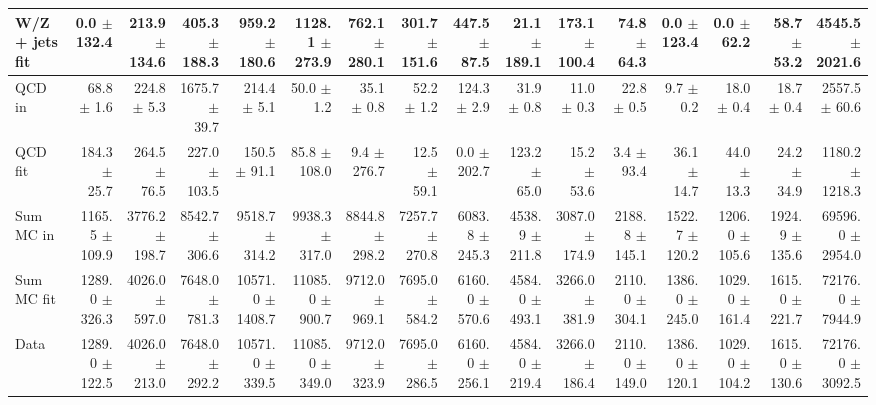\begin{table}[htbp]
{\begin{tabular}{lrrrrrrrrrrrrrrr}
W/Z + jets fit & 0.0 $\pm$ 132.4 & 213.9 $\pm$ 134.6 & 405.3 $\pm$ 188.3 & 959.2 $\pm$ 180.6 & 1128.1 $\pm$ 273.9 & 762.1 $\pm$ 280.1 & 301.7 $\pm$ 151.6 & 447.5 $\pm$ 87.5 & 21.1 $\pm$ 189.1 & 173.1 $\pm$ 100.4 & 74.8 $\pm$ 64.3 & 0.0 $\pm$ 123.4 & 0.0 $\pm$ 62.2 & 58.7 $\pm$ 53.2 & 4545.5 $\pm$ 2021.6 \\
\hline
QCD in & 68.8 $\pm$ 1.6 & 224.8 $\pm$ 5.3 & 1675.7 $\pm$ 39.7 & 214.4 $\pm$ 5.1 & 50.0 $\pm$ 1.2 & 35.1 $\pm$ 0.8 & 52.2 $\pm$ 1.2 & 124.3 $\pm$ 2.9 & 31.9 $\pm$ 0.8 & 11.0 $\pm$ 0.3 & 22.8 $\pm$ 0.5 & 9.7 $\pm$ 0.2 & 18.0 $\pm$ 0.4 & 18.7 $\pm$ 0.4 & 2557.5 $\pm$ 60.6 \\
QCD fit & 184.3 $\pm$ 25.7 & 264.5 $\pm$ 76.5 & 227.0 $\pm$ 103.5 & 150.5 $\pm$ 91.1 & 85.8 $\pm$ 108.0 & 9.4 $\pm$ 276.7 & 12.5 $\pm$ 59.1 & 0.0 $\pm$ 202.7 & 123.2 $\pm$ 65.0 & 15.2 $\pm$ 53.6 & 3.4 $\pm$ 93.4 & 36.1 $\pm$ 14.7 & 44.0 $\pm$ 13.3 & 24.2 $\pm$ 34.9 & 1180.2 $\pm$ 1218.3 \\
\hline
Sum MC in & 1165.5 $\pm$ 109.9 & 3776.2 $\pm$ 198.7 & 8542.7 $\pm$ 306.6 & 9518.7 $\pm$ 314.2 & 9938.3 $\pm$ 317.0 & 8844.8 $\pm$ 298.2 & 7257.7 $\pm$ 270.8 & 6083.8 $\pm$ 245.3 & 4538.9 $\pm$ 211.8 & 3087.0 $\pm$ 174.9 & 2188.8 $\pm$ 145.1 & 1522.7 $\pm$ 120.2 & 1206.0 $\pm$ 105.6 & 1924.9 $\pm$ 135.6& 69596.0 $\pm$ 2954.0 \\
Sum MC fit & 1289.0 $\pm$ 326.3 & 4026.0 $\pm$ 597.0 & 7648.0 $\pm$ 781.3 & 10571.0 $\pm$ 1408.7 & 11085.0 $\pm$ 900.7 & 9712.0 $\pm$ 969.1 & 7695.0 $\pm$ 584.2 & 6160.0 $\pm$ 570.6 & 4584.0 $\pm$ 493.1 & 3266.0 $\pm$ 381.9 & 2110.0 $\pm$ 304.1 & 1386.0 $\pm$ 245.0 & 1029.0 $\pm$ 161.4 & 1615.0 $\pm$ 221.7 & 72176.0 $\pm$ 7944.9 \\
\hline
Data & 1289.0 $\pm$ 122.5 & 4026.0 $\pm$ 213.0 & 7648.0 $\pm$ 292.2 & 10571.0 $\pm$ 339.5 & 11085.0 $\pm$ 349.0 & 9712.0 $\pm$ 323.9 & 7695.0 $\pm$ 286.5 & 6160.0 $\pm$ 256.1 & 4584.0 $\pm$ 219.4 & 3266.0 $\pm$ 186.4 & 2110.0 $\pm$ 149.0 & 1386.0 $\pm$ 120.1 & 1029.0 $\pm$ 104.2 & 1615.0 $\pm$ 130.6 & 72176.0 $\pm$ 3092.5 \\
\hline
\end{tabular}
}
\end{table}
